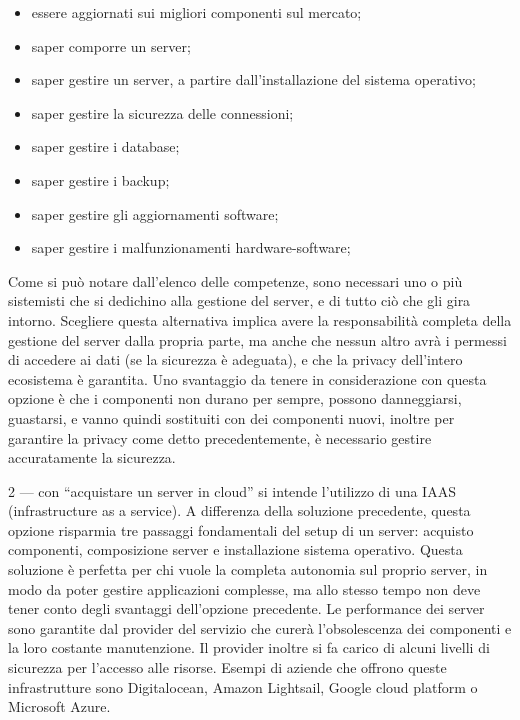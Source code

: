 \documentclass[12pt,a4paper]{article}
\begin{document}
\begin{itemize}
    \item essere aggiornati sui migliori componenti sul mercato;
    \item saper comporre un server;
    \item saper gestire un server, a partire dall’installazione del sistema operativo;
    \item saper gestire la sicurezza delle connessioni;
    \item saper gestire i database;
    \item saper gestire i backup;
    \item saper gestire gli aggiornamenti software;
    \item saper gestire i malfunzionamenti hardware-software;
\end{itemize}

Come si può notare dall’elenco delle competenze, sono necessari uno o più sistemisti che si dedichino alla gestione del server, e di tutto ciò che gli gira intorno.
Scegliere questa alternativa implica avere la responsabilità completa della gestione del server dalla propria parte, ma anche che nessun altro avrà i permessi di accedere ai dati (se la sicurezza è adeguata), e che la privacy dell’intero ecosistema è garantita. Uno svantaggio da tenere in considerazione con questa opzione è che i componenti non durano per sempre, possono danneggiarsi, guastarsi, e vanno quindi sostituiti con dei componenti nuovi, inoltre per garantire la privacy come detto precedentemente, è necessario gestire accuratamente la sicurezza.

2 --- con “acquistare un server in cloud” si intende l’utilizzo di una IAAS (infrastructure as a service). A differenza della soluzione precedente, questa opzione risparmia tre passaggi fondamentali del setup di un server: acquisto componenti, composizione server e installazione sistema operativo.
Questa soluzione è perfetta per chi vuole la completa autonomia sul proprio server, in modo da poter gestire applicazioni complesse, ma allo stesso tempo non deve tener conto degli svantaggi dell’opzione precedente. Le performance dei server sono garantite dal provider del servizio che curerà l’obsolescenza dei componenti e la loro costante manutenzione. Il provider inoltre si fa carico di alcuni livelli di sicurezza per l’accesso alle risorse. Esempi di aziende che offrono queste infrastrutture sono Digitalocean, Amazon Lightsail, Google cloud platform o Microsoft Azure.
\end{document}
